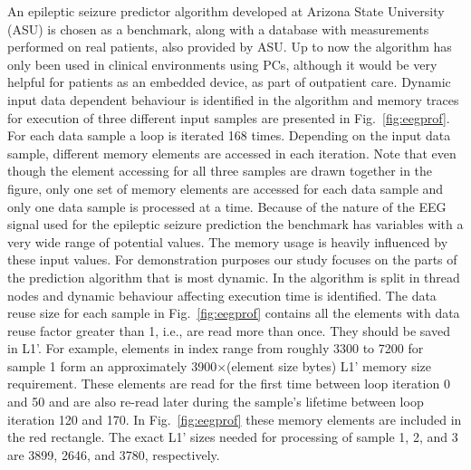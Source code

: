 An epileptic seizure predictor algorithm developed at Arizona State University (ASU) \cite{Iasemidis2005} is chosen as a benchmark, along with a database with measurements performed on real patients, also provided by ASU. Up to now the algorithm has only been used in clinical environments using PCs, although it would be very helpful for patients as an embedded device, as part of outpatient care. Dynamic input data dependent behaviour is identified in the algorithm and memory traces for execution of three different input samples are presented in Fig.~\ref{fig:eegprof}. For each data sample a loop is iterated 168 times. Depending on the input data sample, different memory elements are accessed in each iteration. Note that even though the element accessing for all three samples are drawn together in the figure, only one set of memory elements are accessed for each data sample and only one data sample is processed at a time. Because of the nature of the EEG  signal used for the epileptic seizure prediction the benchmark has variables with a very wide range of potential values. The memory usage is heavily influenced by these input values. For demonstration purposes our study focuses on the parts of the prediction algorithm that is most dynamic. In \cite{Elena2010} the algorithm is split in thread nodes and dynamic behaviour affecting execution time is identified. The data reuse size for each sample in Fig.~\ref{fig:eegprof} contains all the elements with data reuse factor greater than 1, i.e., are read more than once. They should be saved in L1'. For example, elements in index range from roughly 3300 to 7200 for sample 1 form an approximately 3900$ \times $(element size bytes) L1' memory size requirement. These elements are read for the first time between loop iteration 0 and 50 and are also re-read later during the sample's lifetime between loop iteration 120 and 170. In Fig.~\ref{fig:eegprof} these memory elements are included in the red rectangle. The exact L1' sizes needed for processing of sample 1, 2, and 3 are 3899, 2646, and 3780, respectively.

